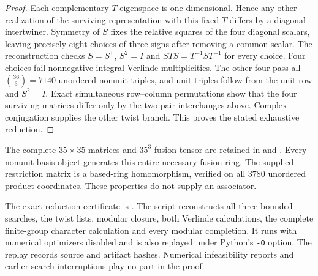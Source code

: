 \begin{proof}
Each complementary $T$-eigenspace is one-dimensional. Hence any other
realization of the surviving representation with this fixed $T$ differs
by a diagonal intertwiner. Symmetry of $S$ fixes the relative squares
of the four diagonal scalars, leaving precisely eight choices of three
signs after removing a common scalar. The reconstruction checks
$S=S^{\mathsf T}$, $S^2=I$ and $STS=T^{-1}ST^{-1}$ for every choice.
Four choices fail nonnegative integral Verlinde multiplicities. The
other four pass all $\binom{36}{3}=7140$ unordered nonunit triples,
and unit triples follow from the unit row and $S^2=I$.
Exact simultaneous row--column permutations show that the four surviving
matrices differ only by the two pair interchanges above. Complex
conjugation supplies the other twist branch. This proves the stated
exhaustive reduction.
\end{proof}

The complete $35\times35$ matrices and $35^3$ fusion tensor are retained
in 
and . Every nonunit basis object
generates this entire necessary fusion ring. The supplied restriction
matrix is a based-ring homomorphism, verified on all $3780$ unordered
product coordinates. These properties do not supply an associator.

The exact reduction certificate is
.
The script  reconstructs all three
bounded searches, the twist lists, modular closure, both Verlinde
calculations, the complete finite-group character calculation and every
modular completion. It runs with numerical optimizers disabled and is
also replayed under Python's \texttt{-O} option. The replay records
source and artifact hashes. Numerical infeasibility reports and earlier
search interruptions play no part in the proof.
